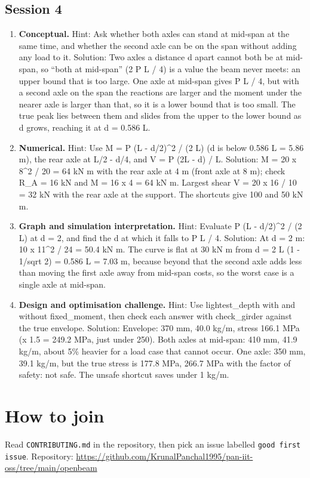 \documentclass[11pt,a4paper]{article}
\begin{document}
\subsection*{Session 4}
\begin{enumerate}[nosep]
\item \textbf{Conceptual.} Hint: Ask whether both axles can stand at mid-span at the same time, and whether the second axle can be on the span without adding any load to it. Solution: Two axles a distance d apart cannot both be at mid-span, so ``both at mid-span'' (2 P L / 4) is a value the beam never meets: an upper bound that is too large. One axle at mid-span gives P L / 4, but with a second axle on the span the reactions are larger and the moment under the nearer axle is larger than that, so it is a lower bound that is too small. The true peak lies between them and slides from the upper to the lower bound as d grows, reaching it at d = 0.586 L.
\item \textbf{Numerical.} Hint: Use M = P (L - d/2)\textasciicircum{}2 / (2 L) (d is below 0.586 L = 5.86 m), the rear axle at L/2 - d/4, and V = P (2L - d) / L. Solution: M = 20 x 8\textasciicircum{}2 / 20 = 64 kN m with the rear axle at 4 m (front axle at 8 m); check R\_A = 16 kN and M = 16 x 4 = 64 kN m. Largest shear V = 20 x 16 / 10 = 32 kN with the rear axle at the support. The shortcuts give 100 and 50 kN m.
\item \textbf{Graph and simulation interpretation.} Hint: Evaluate P (L - d/2)\textasciicircum{}2 / (2 L) at d = 2, and find the d at which it falls to P L / 4. Solution: At d = 2 m: 10 x 11\textasciicircum{}2 / 24 = 50.4 kN m. The curve is flat at 30 kN m from d = 2 L (1 - 1/sqrt 2) = 0.586 L = 7.03 m, because beyond that the second axle adds less than moving the first axle away from mid-span costs, so the worst case is a single axle at mid-span.
\item \textbf{Design and optimisation challenge.} Hint: Use lightest\_depth with and without fixed\_moment, then check each answer with check\_girder against the true envelope. Solution: Envelope: 370 mm, 40.0 kg/m, stress 166.1 MPa (x 1.5 = 249.2 MPa, just under 250). Both axles at mid-span: 410 mm, 41.9 kg/m, about 5\% heavier for a load case that cannot occur. One axle: 350 mm, 39.1 kg/m, but the true stress is 177.8 MPa, 266.7 MPa with the factor of safety: not safe. The unsafe shortcut saves under 1 kg/m.
\end{enumerate}

\section{How to join}
Read \texttt{CONTRIBUTING.md} in the repository, then pick an issue labelled \texttt{good first issue}. Repository: \url{https://github.com/KrunalPanchal1995/pan-iit-oss/tree/main/openbeam}
\end{document}
